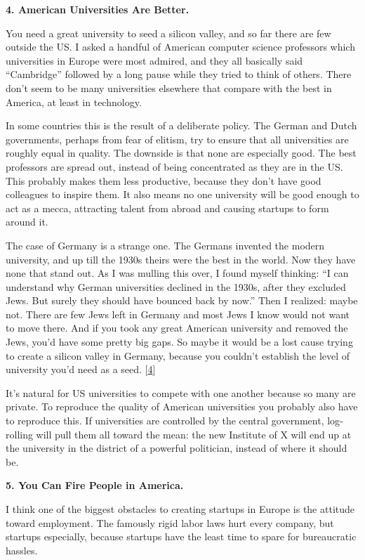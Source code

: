 \textbf{4. American Universities Are Better.}

You need a great university to seed a silicon valley, and so far there
are few outside the US. I asked a handful of American computer science
professors which universities in Europe were most admired, and they all
basically said ``Cambridge'' followed by a long pause while they tried
to think of others. There don't seem to be many universities elsewhere
that compare with the best in America, at least in technology.

In some countries this is the result of a deliberate policy. The German
and Dutch governments, perhaps from fear of elitism, try to ensure that
all universities are roughly equal in quality. The downside is that none
are especially good. The best professors are spread out, instead of
being concentrated as they are in the US. This probably makes them less
productive, because they don't have good colleagues to inspire them. It
also means no one university will be good enough to act as a mecca,
attracting talent from abroad and causing startups to form around it.

The case of Germany is a strange one. The Germans invented the modern
university, and up till the 1930s theirs were the best in the world. Now
they have none that stand out. As I was mulling this over, I found
myself thinking: ``I can understand why German universities declined in
the 1930s, after they excluded Jews. But surely they should have bounced
back by now.'' Then I realized: maybe not. There are few Jews left in
Germany and most Jews I know would not want to move there. And if you
took any great American university and removed the Jews, you'd have some
pretty big gaps. So maybe it would be a lost cause trying to create a
silicon valley in Germany, because you couldn't establish the level of
university you'd need as a seed. {[}\hyperref[f4n]{4}{]}

It's natural for US universities to compete with one another because so
many are private. To reproduce the quality of American universities you
probably also have to reproduce this. If universities are controlled by
the central government, log-rolling will pull them all toward the mean:
the new Institute of X will end up at the university in the district of
a powerful politician, instead of where it should be.

\textbf{5. You Can Fire People in America.}

I think one of the biggest obstacles to creating startups in Europe is
the attitude toward employment. The famously rigid labor laws hurt every
company, but startups especially, because startups have the least time
to spare for bureaucratic hassles.

